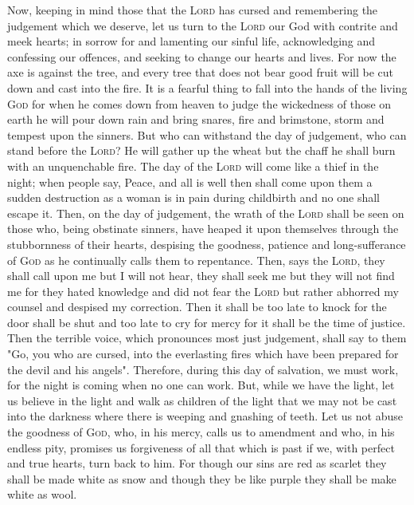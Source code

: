 \documentclass[a5paper]{liturgy}
\begin{document}
\begin{leader}
  \noindent
  Now, keeping in mind those that the \textsc{Lord} has cursed and remembering the judgement which we deserve, let us turn to the \textsc{Lord} our God with contrite and meek hearts; in sorrow for and lamenting our sinful life, acknowledging and confessing our offences, and seeking to change our hearts and lives.
  For now the axe is against the tree, and every tree that does not bear good fruit will be cut down and cast into the fire.
  It is a fearful thing to fall into the hands of the living \textsc{God} for when he comes down from heaven to judge the wickedness of those on earth he will pour down rain and bring snares, fire and brimstone, storm and tempest upon the sinners.
  But who can withstand the day of judgement, who can stand before the \textsc{Lord}? He will gather up the wheat but the chaff he shall burn with an unquenchable fire.
  The day of the \textsc{Lord} will come like a thief in the night; when people say, Peace, and all is well then shall come upon them a sudden destruction as a woman is in pain during childbirth and no one shall escape it.
  Then, on the day of judgement, the wrath of the \textsc{Lord} shall be seen on those who, being obstinate sinners, have heaped it upon themselves through the stubbornness of their hearts, despising the goodness, patience and long-sufferance of \textsc{God} as he continually calls them to repentance.
  Then, says the \textsc{Lord}, they shall call upon me but I will not hear, they shall seek me but they will not find me for they hated knowledge and did not fear the \textsc{Lord} but rather abhorred my counsel and despised my correction.
  Then it shall be too late to knock for the door shall be shut and too late to cry for mercy for it shall be the time of justice.
  Then the terrible voice, which pronounces most just judgement, shall say to them "Go, you who are cursed, into the everlasting fires which have been prepared for the devil and his angels".
  Therefore, during this day of salvation, we must work, for the night is coming when no one can work.
  But, while we have the light, let us believe in the light and walk as children of the light that we may not be cast into the darkness where there is weeping and gnashing of teeth.
  Let us not abuse the goodness of \textsc{God}, who, in his mercy, calls us to amendment and who, in his endless pity, promises us forgiveness of all that which is past if we, with perfect and true hearts, turn back to him.
  For though our sins are red as scarlet they shall be made white as snow and though they be like purple they shall be make white as wool.

\end{leader}
\end{document}
